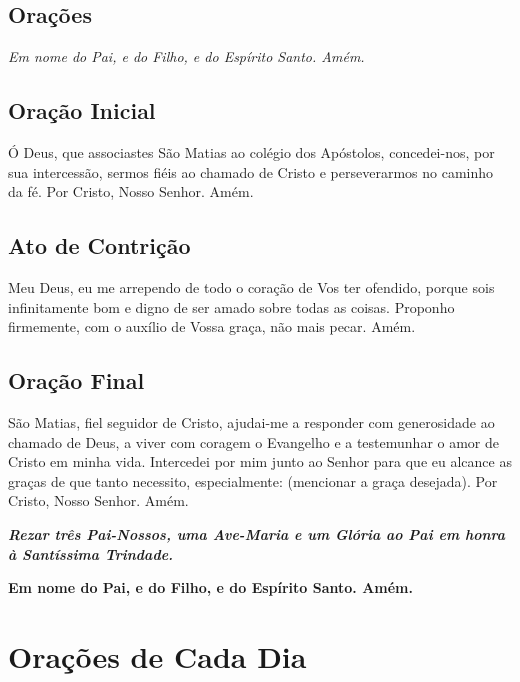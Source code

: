 \documentclass[18pt]{article}
\begin{document}

\newpage

\begin{center}
\section{Orações}\label{sec:Orações}
\textit{Em nome do Pai, e do Filho, e do Espírito Santo. Amém.}
\end{center}

\subsection*{Oração Inicial}
Ó Deus, que associastes São Matias ao colégio dos Apóstolos, concedei-nos, por sua intercessão, sermos fiéis ao chamado de Cristo e perseverarmos no caminho da fé. Por Cristo, Nosso Senhor. Amém.

\subsection*{Ato de Contrição}
Meu Deus, eu me arrependo de todo o coração de Vos ter ofendido, porque sois infinitamente bom e digno de ser amado sobre todas as coisas. Proponho firmemente, com o auxílio de Vossa graça, não mais pecar. Amém.

\subsection*{Oração Final}
São Matias, fiel seguidor de Cristo, ajudai-me a responder com generosidade ao chamado de Deus, a viver com coragem o Evangelho e a testemunhar o amor de Cristo em minha vida. Intercedei por mim junto ao Senhor para que eu alcance as graças de que tanto necessito, especialmente: (mencionar a graça desejada). Por Cristo, Nosso Senhor. Amém.

\textbf{\textit{Rezar três Pai-Nossos, uma Ave-Maria e um Glória ao Pai em honra à Santíssima Trindade.}}

\textbf{Em nome do Pai, e do Filho, e do Espírito Santo. Amém.}

\vfill


\newpage

\section*{Orações de Cada Dia}
\end{document}

